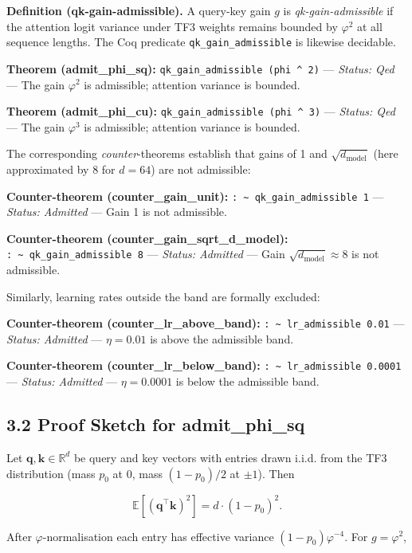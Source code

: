 \textbf{Definition (qk-gain-admissible).} A
query-key gain \(g\) is \emph{qk-gain-admissible}
if the attention logit variance under TF3 weights
remains bounded by \(\varphi^2\) at all sequence
lengths. The Coq predicate
\texttt{qk\_gain\_admissible} is likewise
decidable.

\textbf{Theorem (admit\_phi\_sq):}
\texttt{qk\_gain\_admissible\ (phi\ \^{}\ 2)} ---
\emph{Status: Qed} --- The gain \(\varphi^2\) is
admissible; attention variance is bounded.

\textbf{Theorem (admit\_phi\_cu):}
\texttt{qk\_gain\_admissible\ (phi\ \^{}\ 3)} ---
\emph{Status: Qed} --- The gain \(\varphi^3\) is
admissible; attention variance is bounded.

The corresponding \emph{counter}-theorems
establish that gains of 1 and
\(\sqrt{d_\text{model}}\) (here approximated by 8
for \(d=64\)) are not admissible:

\textbf{Counter-theorem (counter\_gain\_unit):}
\texttt{:\ \textasciitilde{}\ qk\_gain\_admissible\ 1}
--- \emph{Status: Admitted} --- Gain 1 is not
admissible.

\textbf{Counter-theorem
(counter\_gain\_sqrt\_d\_model):}
\texttt{:\ \textasciitilde{}\ qk\_gain\_admissible\ 8}
--- \emph{Status: Admitted} --- Gain
\(\sqrt{d_\text{model}} \approx 8\) is not
admissible.

Similarly, learning rates outside the band are
formally excluded:

\textbf{Counter-theorem
(counter\_lr\_above\_band):}
\texttt{:\ \textasciitilde{}\ lr\_admissible\ 0.01}
--- \emph{Status: Admitted} --- \(\eta = 0.01\) is
above the admissible band.

\textbf{Counter-theorem
(counter\_lr\_below\_band):}
\texttt{:\ \textasciitilde{}\ lr\_admissible\ 0.0001}
--- \emph{Status: Admitted} --- \(\eta = 0.0001\)
is below the admissible band.

\subsection{3.2 Proof Sketch for
admit\_phi\_sq}\label{proof-sketch-for-admit_phi_sq}

Let \(\mathbf{q}, \mathbf{k} \in \mathbb{R}^d\) be
query and key vectors with entries drawn i.i.d.
from the TF3 distribution (mass \(p_0\) at 0, mass
\((1-p_0)/2\) at \(\pm 1\)). Then

\[\mathbb{E}[(\mathbf{q}^\top \mathbf{k})^2] = d \cdot (1-p_0)^2.\]

After \(\varphi\)-normalisation each entry has effective
variance \((1-p_0)\varphi^{-4}\). For
\(g = \varphi^2\),

